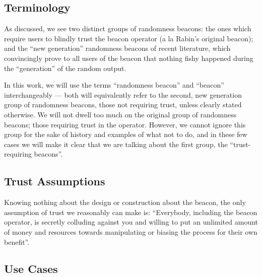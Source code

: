 

\subsection{Terminology}
As discussed, we see two distinct groups of randomness beacons: the ones which require users to blindly trust the beacon operator (a la Rabin's original beacon); and the \enquote{new generation} randomness beacons of recent literature, which convincingly prove to all users of the beacon that nothing fishy happened during the \enquote{generation} of the random output.

In this work, we will use the terms \enquote{randomness beacon} and \enquote{beacon} interchangeably --- both will equivalently refer to the second, new generation group of randomness beacons, those not requiring trust, unless clearly stated otherwise.
We will not dwell too much on the original group of randomness beacons; those requiring trust in the operator.
However, we cannot ignore this group for the sake of history and examples of what not to do, and in these few cases we will make it clear that we are talking about the first group, the \enquote{trust-requiring beacons}.

\subsection{Trust Assumptions}
Knowing nothing about the design or construction about the beacon, the only assumption of trust we reasonably can make is:
\enquote{Everybody, including the beacon operator, is secretly colluding against you and willing to put an unlimited amount of money and resources towards manipulating or biasing the process for their own benefit}.


\subsection{Use Cases}

